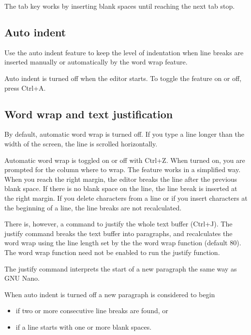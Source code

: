 \documentclass{article}
\begin{document}
        The tab key works by inserting blank spaces until reaching the next tab stop.

    \subsection{Auto indent}
    
        Use the auto indent feature to keep the level of indentation when line breaks are inserted manually or automatically by
        the word wrap feature.

        Auto indent is turned off when the editor starts. To toggle the feature on or off, press Ctrl+A.
    
    \subsection{Word wrap and text justification}
    \label{wordwrap}

        By default, automatic word wrap is turned off. If you type a line longer than the width of the screen, the line
        is scrolled horizontally.

        Automatic word wrap is toggled on or off with Ctrl+Z. When turned on, you are prompted for the column where
        to wrap. The feature works in a simplified way. When you reach the right margin, the editor breaks the
        line after the previous blank space. If there is no blank space on the line, the line break is inserted
        at the right margin. If you delete characters from a line or if you insert characters at the beginning of a line,
        the line breaks are not recalculated.

        There is, however, a command to justify the whole text buffer (Ctrl+J). The justify command breaks the text buffer into
        paragraphs, and recalculates the word wrap using the line length set by the the word wrap function (default 80). The
        word wrap function need not be enabled to run the justify function.

        The justify command interprets the start of a new paragraph the same way as GNU Nano. 
        
        When auto indent is turned off a new paragraph is considered to begin

        \begin{itemize}
		    \item if two or more consecutive line breaks are found, or
		    \item if a line starts with one or more blank spaces.
	    \end{itemize}
\end{document}
